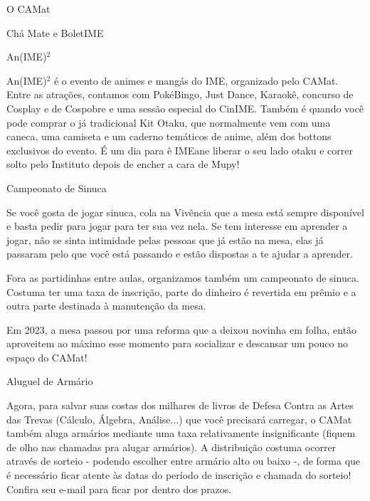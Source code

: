\begin{secao}{O CAMat}
\begin{subsecao}{Chá Mate e BoletIME}
\end{subsecao}


\begin{subsecao}{An(IME)\texorpdfstring{$^2$}{²}}

An(IME)$^2$ é o evento de animes e mangás do IME, organizado pelo CAMat. Entre as atrações,
contamos com PokéBingo, Just Dance, Karaokê, concurso de Cosplay e de Cospobre e uma sessão 
especial do CinIME.
Também é quando você pode comprar o já tradicional Kit Otaku, que normalmente vem com uma
caneca, uma camiseta e um caderno temáticos de anime, além dos bottons exclusivos do evento.
É um dia para ê IMEane liberar o seu lado otaku e correr solto pelo Instituto depois de
encher a cara de Mupy!

\end{subsecao}

\begin{subsecao}{Campeonato de Sinuca}

Se você gosta de jogar sinuca, cola na Vivência que a mesa está sempre disponível
e basta pedir para jogar para ter sua vez nela. Se tem interesse em aprender a jogar,
não se sinta intimidade pelas pessoas que já estão na mesa, elas já passaram pelo
que você está passando e estão dispostas a te ajudar a aprender.

Fora as partidinhas entre aulas, organizamos também um campeonato de sinuca. Costuma
ter uma taxa de inscrição, parte do dinheiro é revertida em prêmio e a outra parte
destinada à manutenção da mesa.

Em 2023, a mesa passou por uma reforma que a deixou novinha em folha, então aproveitem
ao máximo esse momento para socializar e descansar um pouco no espaço do CAMat! %

\end{subsecao}


\begin{subsecao}{Aluguel de Armário}

Agora, para salvar suas costas dos milhares de livros de Defesa Contra as Artes
das Trevas (Cálculo, Álgebra, Análise...) que você precisará carregar, o CAMat
também aluga armários mediante uma taxa relativamente insignificante (fiquem de olho
nas chamadas pra alugar armários). A distribuição costuma ocorrer através de sorteio -
podendo escolher entre armário alto ou baixo -, de forma que é necessário ficar atente
às datas do período de inscrição e chamada do sorteio! Confira seu e-mail para ficar por 
dentro dos prazos.

\end{subsecao}


\end{secao}
